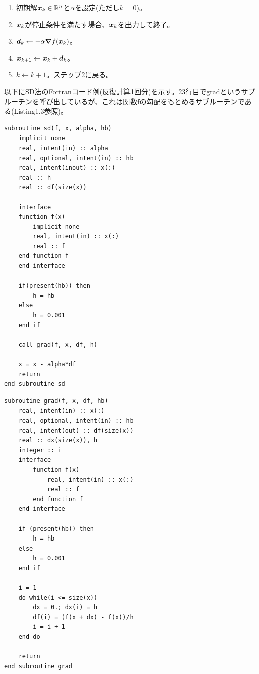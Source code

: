 \documentclass[dvipdfmx, 9pt, a4paper]{jsarticle}
\numberwithin{equation}{section}
\newcommand{\bm}[1]{{\mbox{\boldmath $#1$}}}
\begin{document}
\begin{tcolorbox}[title = 最急降下法]
\begin{enumerate}
\item 初期解$\bm x_k \in \mathbb{R}^n$と$\alpha$を設定(ただし$k=0$)。
\item $\bm x_k$が停止条件を満たす場合、$\bm x_k$を出力して終了。
\item $\bm d_k \leftarrow -\alpha \bm \nabla f(\bm x_k)$。
\item $\bm x_{k+1} \leftarrow \bm x_k + \bm d_k$。
\item $k \leftarrow k+1$。ステップ2に戻る。
\end{enumerate}
\end{tcolorbox}\par
以下にSD法のFortranコード例(反復計算1回分)を示す。23行目でgradというサブルーチンを呼び出しているが、これは関数fの勾配をもとめるサブルーチンである(Listing1.3参照)。
\begin{lstlisting}[caption=SD法]
subroutine sd(f, x, alpha, hb)
	implicit none
	real, intent(in) :: alpha
	real, optional, intent(in) :: hb
	real, intent(inout) :: x(:)
	real :: h
	real :: df(size(x))

	interface
	function f(x)
		implicit none
		real, intent(in) :: x(:)
		real :: f
	end function f
	end interface

	if(present(hb)) then
		h = hb
	else
		h = 0.001
	end if

	call grad(f, x, df, h)

	x = x - alpha*df
	return
end subroutine sd
\end{lstlisting}

\begin{lstlisting}[caption=勾配計算のためのサブルーチン]
subroutine grad(f, x, df, hb)
	real, intent(in) :: x(:)
	real, optional, intent(in) :: hb
	real, intent(out) :: df(size(x))
	real :: dx(size(x)), h
	integer :: i
	interface
		function f(x)
			real, intent(in) :: x(:)
			real :: f
		end function f
	end interface

	if (present(hb)) then
		h = hb
	else
		h = 0.001
	end if

	i = 1
	do while(i <= size(x))
		dx = 0.; dx(i) = h
		df(i) = (f(x + dx) - f(x))/h
		i = i + 1
	end do

	return
end subroutine grad
\end{lstlisting}
\end{document}
